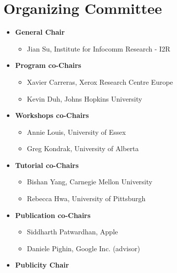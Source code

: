 \section{Organizing Committee}
\begin{itemize}[itemsep=7pt, leftmargin=0cm, label={}]
\item \textbf{General Chair}

\begin{itemize}[nosep, leftmargin=0.5cm, label={}]
\item Jian Su, Institute for Infocomm Research - I2R
\end{itemize}
\item \textbf{Program co-Chairs}

\begin{itemize}[nosep, leftmargin=0.5cm, label={}]
\item Xavier Carreras, Xerox Research Centre Europe 
\item Kevin Duh, Johns Hopkins University 
\end{itemize}
\item \textbf{Workshops co-Chairs}

\begin{itemize}[nosep, leftmargin=0.5cm, label={}]
\item Annie Louis, University of Essex
\item Greg Kondrak, University of Alberta
\end{itemize}
\item \textbf{Tutorial co-Chairs}

\begin{itemize}[nosep, leftmargin=0.5cm, label={}]
\item Bishan Yang, Carnegie Mellon University 
\item Rebecca Hwa, University of Pittsburgh 
\end{itemize}
\item \textbf{Publication co-Chairs} 

\begin{itemize}[nosep, leftmargin=0.5cm, label={}]
\item Siddharth Patwardhan, Apple 
\item Daniele Pighin, Google Inc. (advisor)  
\end{itemize}
\item \textbf{Publicity Chair} 


\end{itemize}
